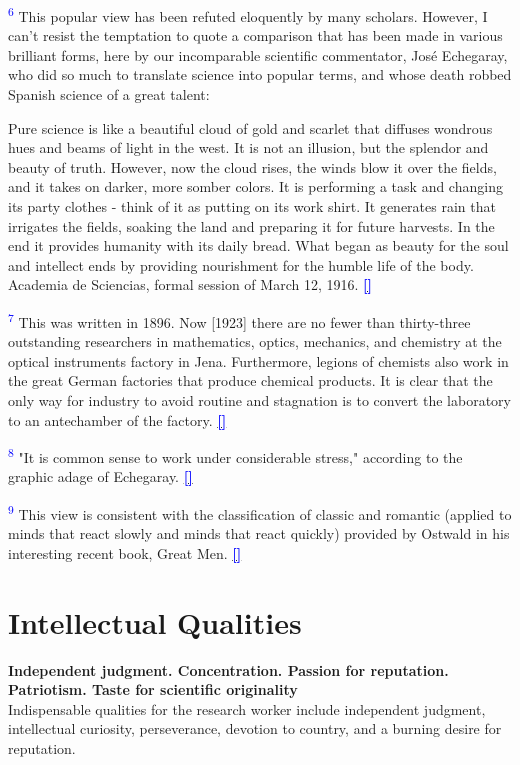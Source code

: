 \documentclass{article}
\newcommand{\boldline}[1]{%
 \vspace{\baselineskip}%
 \noindent\textbf{#1}\\[0.5\baselineskip]%
}
\newcommand{\notetext}[2]{
 \par\noindent
 \hypertarget{note:#1}{\textsuperscript{\textcolor{blue}{#1}}} #2
 \hyperlink{ref:#1}{\textcolor{blue}{\textbf{[\textuparrow]}}}
 \par\vspace{1em}
}
\begin{document}
\notetext{6}{This popular view has been refuted eloquently by many scholars. However, I can’t resist the temptation to quote a comparison that has been made in various brilliant forms, here by our incomparable scientific commentator, José Echegaray, who did so much to translate science into popular terms, and whose death robbed Spanish science of a great talent:

Pure science is like a beautiful cloud of gold and scarlet that diffuses wondrous hues and beams of light in the west. It is not an illusion, but the splendor and beauty of truth. However, now the cloud rises, the winds blow it over the fields, and it takes on darker, more somber colors. It is performing a task and changing its party clothes - think of it as putting on its work shirt. It generates rain that irrigates the fields, soaking the land and preparing it for future harvests. In the end it provides humanity with its daily bread. What began as beauty for the soul and intellect ends by providing nourishment for the humble life of the body. Academia de Sciencias, formal session of March 12, 1916.}

\notetext{7}{This was written in 1896. Now [1923] there are no fewer than thirty-three outstanding researchers in mathematics, optics, mechanics, and chemistry at the optical instruments factory in Jena. Furthermore, legions of chemists also work in the great German factories that produce chemical products. It is clear that the only way for industry to avoid routine and stagnation is to convert the laboratory to an antechamber of the factory.}

\notetext{8}{"It is common sense to work under considerable stress," according to the graphic adage of Echegaray.}

\notetext{9}{This view is consistent with the classification of classic and romantic (applied to minds that react slowly and minds that react quickly) provided by Ostwald in his interesting recent book, Great Men.}

\newpage \section{Intellectual Qualities}

\boldline{Independent judgment. Concentration. Passion for reputation. Patriotism. Taste for scientific originality}

Indispensable qualities for the research worker include independent judgment, intellectual curiosity, perseverance, devotion to country, and a burning desire for reputation.
\end{document}
